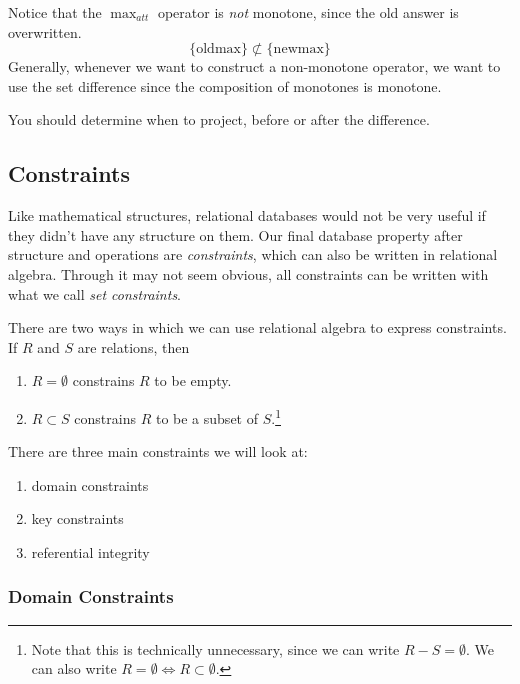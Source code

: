     Notice that the $\max_{att}$ operator is \textit{not} monotone, since the old answer is overwritten. 
    \begin{equation}
      \{\mathrm{old max}\} \not\subset \{\mathrm{new max}\}
    \end{equation}
    Generally, whenever we want to construct a non-monotone operator, we want to use the set difference since the composition of monotones is monotone. 

    You should determine when to project, before or after the difference. 

\subsection{Constraints} 

  Like mathematical structures, relational databases would not be very useful if they didn't have any structure on them. Our final database property after structure and operations are \textit{constraints}, which can also be written in relational algebra. Through it may not seem obvious, all constraints can be written with what we call \textit{set constraints}. 

  \begin{definition}
    There are two ways in which we can use relational algebra to express constraints. If $R$ and $S$ are relations, then 
    \begin{enumerate}
      \item $R = \emptyset$ constrains $R$ to be empty.
      \item $R \subset S$ constrains $R$ to be a subset of $S$.\footnote{Note that this is technically unnecessary, since we can write $R - S = \emptyset$. We can also write $R = \emptyset \iff R \subset \emptyset$.}
    \end{enumerate}
  \end{definition} 

  There are three main constraints we will look at: 
  \begin{enumerate}
    \item domain constraints 
    \item key constraints 
    \item referential integrity
  \end{enumerate}

  \subsubsection{Domain Constraints}

